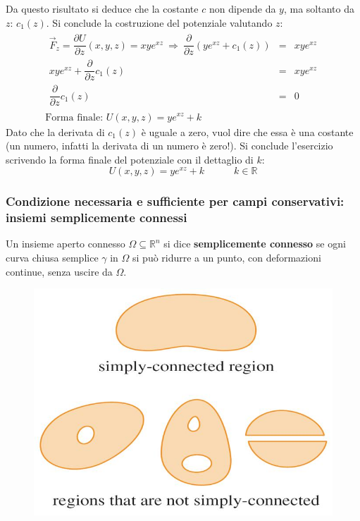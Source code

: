 \documentclass[a4paper]{article}
\newcommand{\definition}[1]{\textcolor{Red3}{\textbf{#1}}}
\begin{document}
	Da questo risultato si deduce che la costante $c$ non dipende da $y$, ma soltanto da $z$: $c_{1}\left(z\right)$. Si conclude la costruzione del potenziale valutando $z$:
	\begin{gather*}
		\begin{array}{rcl}
			\overset{\rightarrow}{F}_{z} = \dfrac{\partial U}{\partial z}\left(x,y,z\right) = xye^{xz} \: \Longrightarrow \: \dfrac{\partial }{\partial z}\left(ye^{xz} + c_{1}\left(z\right)\right)
			&=&
			xye^{xz} \\ [1em]
			xye^{xz} + \dfrac{\partial}{\partial z}c_{1}\left(z\right)
			&=&
			xye^{xz} \\ [1em]
			\dfrac{\partial}{\partial z}c_{1}\left(z\right)
			&=&
			0
		\end{array}
		\\
		\text{Forma finale: } U\left(x,y,z\right) = ye^{xz} + k
	\end{gather*}
	Dato che la derivata di $c_{1}\left(z\right)$ è uguale a zero, vuol dire che essa è una costante (un numero, infatti la derivata di un numero è zero!). Si conclude l'esercizio scrivendo la forma finale del potenziale con il dettaglio di $k$:
	\begin{equation*}
		U\left(x,y,z\right) = ye^{xz} + k \hspace{3em} k \in \mathbb{R}
	\end{equation*}\newpage

	\subsubsection{Condizione necessaria e sufficiente per campi conservativi: insiemi semplicemente connessi}

	\begin{boxdef}
		Un insieme aperto connesso $\Omega \subseteq \mathbb{R}^{n}$ si dice \definition{semplicemente connesso} se ogni curva chiusa semplice $\gamma$ in $\Omega$ si può ridurre a un punto, con deformazioni continue, senza uscire da $\Omega$.
	\end{boxdef}

	\begin{figure}[!htp]
		\centering
		\includegraphics[width=.5\textwidth]{img/differenza_insiemi.png}
	\end{figure}
\end{document}
